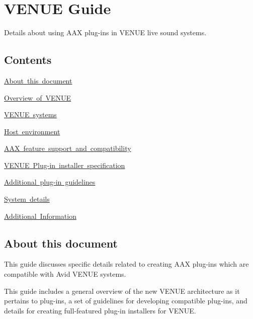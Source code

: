 \hypertarget{a00849}{}\section{V\+E\+N\+UE Guide}
\label{a00849}
Details about using A\+AX plug-\/ins in V\+E\+N\+UE live sound systems. 

\hypertarget{a00849_aax_venue_guide_contents}{}\subsection{Contents}\label{a00849_aax_venue_guide_contents}
\begin{DoxyItemize}
\item \mbox{\hyperlink{a00849_aax_venue_guide__about_this_document}{About this document}} \item \mbox{\hyperlink{a00849_aax_venue_guide__overview}{Overview of V\+E\+N\+UE}} \item \mbox{\hyperlink{a00849_aax_venue_guide__systems}{V\+E\+N\+UE systems}} \item \mbox{\hyperlink{a00849_aax_venue_guide__environment}{Host environment}} \item \mbox{\hyperlink{a00849_aax_venue_guide__features}{A\+AX feature support and compatibility}} \item \mbox{\hyperlink{a00849_aax_venue_guide__installer}{V\+E\+N\+UE Plug-\/in installer specification}} \item \mbox{\hyperlink{a00849_aax_venue_guide__guidelines}{Additional plug-\/in guidelines}} \item \mbox{\hyperlink{a00849_aax_venue_guide__system_details}{System details}} \item \mbox{\hyperlink{a00849_aax_venue_guide__additional_information}{Additional Information}}\end{DoxyItemize}
 \hypertarget{a00849_aax_venue_guide__about_this_document}{}\subsection{About this document}\label{a00849_aax_venue_guide__about_this_document}
This guide discusses specific details related to creating A\+AX plug-\/ins which are compatible with Avid V\+E\+N\+UE systems.

This guide includes a general overview of the new V\+E\+N\+UE architecture as it pertains to plug-\/ins, a set of guidelines for developing compatible plug-\/ins, and details for creating full-\/featured plug-\/in installers for V\+E\+N\+UE.


